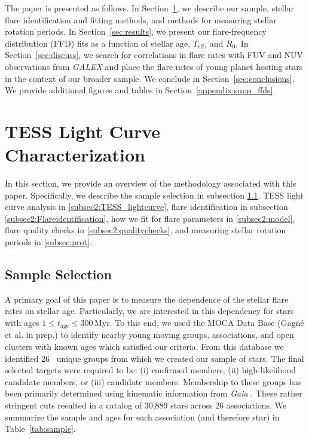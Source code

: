 \documentclass[twocolumn]{aastex631}
\begin{document}
The paper is presented as follows. In Section~\ref{sec:methods}, we describe our sample, stellar flare identification and fitting methods, and methods for measuring stellar rotation periods. In Section~\ref{sec:results}, we present our flare-frequency distribution (FFD) fits as a function of stellar age, $T_\textrm{eff}$, and $R_0$. In Section~\ref{sec:discuss}, we search for correlations in flare rates with FUV and NUV observations from \textit{GALEX} and place the flare rates of young planet hosting stars in the context of our broader sample. We conclude in Section~\ref{sec:conclusions}. We provide additional figures and tables in Section~\ref{appendix:supp_ffds}.

\section{TESS Light Curve Characterization}\label{sec:methods}

In this section, we provide an overview of the methodology associated with this paper. Specifically, we describe the sample selection in subsection \ref{subsec2:sample}, TESS light curve analysis in \ref{subsec2:TESS_lightcurve}, flare identification in subsection \ref{subsec2:Flareidentification}, how we fit for flare parameters in \ref{subsec2:model}, flare quality checks in \ref{subsec2:qualitychecks}, and measuring stellar rotation periods in \ref{subsec:prot}.

\subsection{Sample Selection}\label{subsec2:sample}

A primary goal of this paper is to measure the dependence of the stellar flare rates on stellar age. Particularly, we are interested in this dependency for stars with ages $1 \leq t_\textrm{age} \leq 300$\,Myr. To this end, we used the MOCA Data Base (Gagné et al. in prep.) to identify nearby young moving groups, associations, and open clusters with known ages which satisfied our criteria. From this database we identified 26~ unique groups from which we created our sample of stars. The final selected targets were required to be: (i) confirmed members, (ii) high-likelihood candidate members, or (iii) candidate members. Membership to these groups has been primarily determined using kinematic information from \textit{Gaia} \citep{gaia16, gaia18}. These rather stringent cuts resulted in a catalog of 30,889 stars across 26 associations. We summarize the sample and ages for each association (and therefore star) in Table~\ref{tab:sample}.
\end{document}
